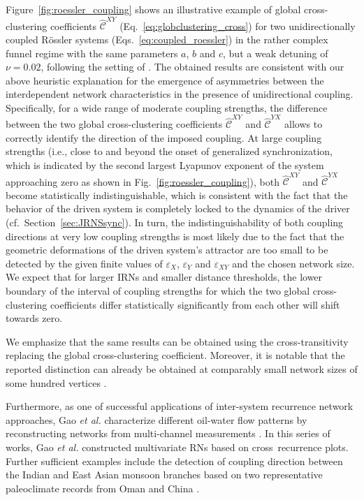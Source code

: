 		Figure~\ref{fig:roessler_coupling} shows an illustrative example of global cross-clustering coefficients $\hat{\mathcal{C}}^{XY}$ (Eq.~\ref{eq:globclustering_cross}) for two unidirectionally coupled R\"ossler systems (Eqs.~\eqref{eq:coupled_roessler}) in the rather complex funnel regime with the same parameters $a$, $b$ and $c$, but a weak detuning of $\nu=0.02$, following the setting of \cite{Feldhoff2012}. The obtained results are consistent with our above heuristic explanation for the emergence of asymmetries between the interdependent network characteristics in the presence of unidirectional coupling. Specifically, for a wide range of moderate coupling strengths, the difference between the two global cross-clustering coefficients $\hat{\mathcal{C}}^{XY}$ and $\hat{\mathcal{C}}^{YX}$ allows to correctly identify the direction of the imposed coupling. At large coupling strengths (i.e., close to and beyond the onset of generalized synchronization, which is indicated by the second largest Lyapunov exponent of the system approaching zero as shown in Fig.~\ref{fig:roessler_coupling}), both $\hat{\mathcal{C}}^{XY}$ and $\hat{\mathcal{C}}^{YX}$ become statistically indistinguishable, which is consistent with the fact that the behavior of the driven system is completely locked to the dynamics of the driver (cf.\, Section~\ref{sec:JRNSsync}). In turn, the indistinguishability of both coupling directions at very low coupling strengths is most likely due to the fact that the geometric deformations of the driven system's attractor are too small to be detected by the given finite values of $\varepsilon_X$, $\varepsilon_Y$ and $\varepsilon_{XY}$ and the chosen network size. We expect that for larger IRNs and smaller distance thresholds, the lower boundary of the interval of coupling strengths for which the two global cross-clustering coefficients differ statistically significantly from each other will shift towards zero.

		We emphasize that the same results can be obtained using the cross-transitivity replacing the global cross-clustering coefficient. Moreover, it is notable that the reported distinction can already be obtained at comparably small network sizes of some hundred vertices \cite{Feldhoff2012}.

		Furthermore, as one of successful applications of inter-system recurrence network approaches, Gao {\textit{et al.}} characterize different oil-water flow patterns by reconstructing networks from multi-channel measurements \cite{Gao2013,Gao2016b,Gao2016c}. In this series of works, Gao {\textit{et al.}} constructed multivariate RNs based on cross~recurrence plots. Further sufficient examples include the detection of coupling direction between the Indian and East Asian monsoon branches based on two representative paleoclimate records from Oman and China \cite{Feldhoff2012}.


